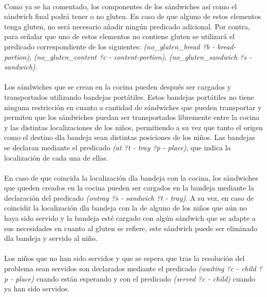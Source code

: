 \documentclass{article}
\begin{document}
\paragraph{}
Como ya se ha comentado, los componentes de los sándwiches así como el sándwich
final podrá tener o no gluten. En caso de que alguno de estos elementos tenga
gluten, no será necesario añadir ningún predicado adicional. Por contra, para
señalar que uno de estos elementos no contiene gluten se utilizará el predicado
correspondiente de los siguientes: \textit{(no\_gluten\_bread ?b - bread-portion)}, \textit{(no\_gluten\_content ?c - content-portion)}, \textit{(no\_gluten\_sandwich
?s - sandwich)}.

\paragraph{}
Los sándwiches que se crean en la cocina pueden después ser cargados y
transportados utilizando bandejas portátiles. Estos bandejas portátiles no tiene
ninguna restricción en cuanto a cantidad de sándwiches que pueden transportar y
permiten que los sándwiches puedan ser transportados libremente entre la cocina
y las distintas localizaciones de los niños, permitiendo a su vez que tanto el
origen como el destino dla bandeja sean distintas posiciones de los niños. Las
bandejas se declaran mediante el predicado \textit{(at ?t - tray ?p - place)}, que
indica la localización de cada una de ellas.

\paragraph{}
En caso de que coincida la localización dla bandeja con la cocina, los
sándwiches que queden creados en la cocina pueden ser cargados en la bandeja
mediante la declaración del predicado \textit{(ontray ?s - sandwich ?t - tray)}. A su
vez, en caso de coincidir la localización dla bandeja con la de alguno de los
niños que aún no haya sido servido y la bandeja esté cargado con algún sándwich
que se adapte a sus necesidades en cuanto al gluten se refiere, este sándwich
puede ser eliminado dla bandeja y servido al niño.

\paragraph{}
Los niños que no han sido servidos y que se espera que tras la resolución del
problema sean servidos son declarados mediante el predicado
\textit{(waiting ?c - child ?p - place)} cuando están esperando y con el
predicado \textit{(served ?c - child)} cuando ya han sido servidos.
\end{document}

